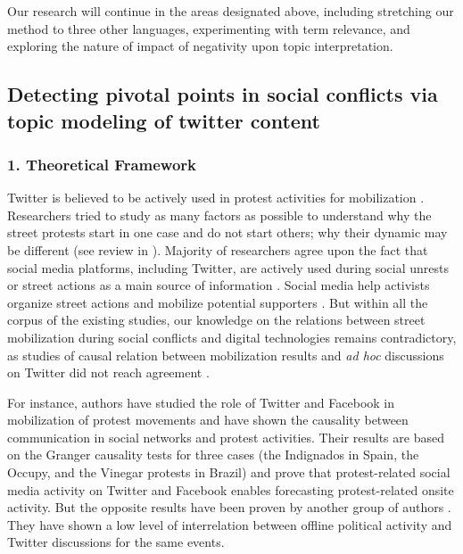 Our research will continue in the areas designated above, including stretching our method to three other languages, experimenting with term relevance, and exploring the nature of impact of negativity upon topic interpretation.

\subsection{Detecting pivotal points in social conflicts via topic modeling of twitter content}\label{subsec:ch5/sec2/sub5}

\subsubsection{1. Theoretical Framework}

Twitter is believed to be actively used in protest activities for mobilization \cite{TheocharisLoweVanDeth,CarenGaby}. Researchers tried to study as many factors as possible to understand why the street protests start in one case and do not start others; why their dynamic may be different (see review in \cite{KoltsovaSelivanova}). Majority of researchers agree upon the fact that social media platforms, including Twitter, are actively used during social unrests or street actions as a main source of information \cite{AnduizaGallegoCantijoch,TufekciWilson}. Social media help activists organize street actions and mobilize potential supporters \cite{EarlKimport,FlesherFominaya}. But within all the corpus of the existing studies, our knowledge on the relations between street mobilization during social conflicts and digital technologies remains contradictory, as studies of causal relation between mobilization results and \textit{ad hoc} discussions on Twitter did not reach agreement \cite{Mercea}.

For instance, authors \cite{BastosMerceaCharperntier} have studied the role of Twitter and Facebook in mobilization of protest movements and have shown the causality between communication in social networks and protest activities. Their results are based on the Granger causality tests for three cases (the Indignados in Spain, the Occupy, and the Vinegar protests in Brazil) and prove that protest-related social media activity on Twitter and Facebook enables forecasting protest-related onsite activity. But the opposite results have been proven by another group of authors \cite{TheocharisLoweVanDeth}. They have shown a low level of interrelation between offline political activity and Twitter discussions for the same events.

